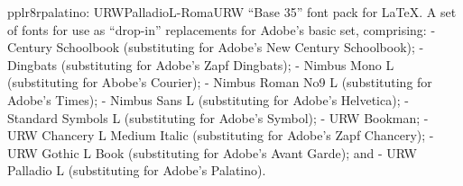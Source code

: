 \documentclass{ddltxtyp}
\begin{document}
\begin{package}{pplr8r}{palatino: URWPalladioL-Roma}{URW ``Base 35'' font pack for {\LaTeX}.}
A set of fonts for use as ``drop-in'' replacements for Adobe's
basic set, comprising: - Century Schoolbook (substituting for
Adobe's New Century Schoolbook); - Dingbats (substituting for
Adobe's Zapf Dingbats); - Nimbus Mono L (substituting for
Abobe's Courier); - Nimbus Roman No9 L (substituting for
Adobe's Times); - Nimbus Sans L (substituting for Adobe's
Helvetica); - Standard Symbols L (substituting for Adobe's
Symbol); - URW Bookman; - URW Chancery L Medium Italic
(substituting for Adobe's Zapf Chancery); - URW Gothic L Book
(substituting for Adobe's Avant Garde); and - URW Palladio L
(substituting for Adobe's Palatino).
\end{package}
\end{document}
